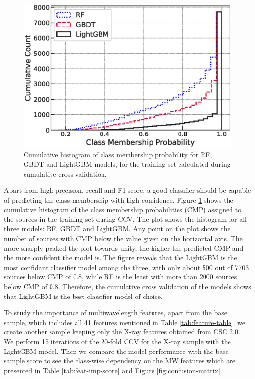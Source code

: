 \documentclass[fleqn,usenatbib]{mnras}
\begin{document}
    \begin{figure}
        \centering
        \includegraphics[width=\columnwidth]{images/prob_distribution.eps}
        \caption{Cumulative histogram of class membership probability for RF, GBDT and LightGBM models, for the training set calculated during cumulative cross validation.}
        \label{fig:cum-prob-dist}
    \end{figure}
    Apart from high precision, recall and F1 score, a good classifier should be capable of predicting the class membership with high confidence. 
    Figure \ref{fig:cum-prob-dist} shows the cumulative histogram of the class membership probabilities (CMP) assigned to the sources in the training set during CCV. The plot shows the histogram for all three models: RF, GBDT and LightGBM. Any point on the plot shows the number of sources with CMP below the value given on the horizontal axis. The more sharply peaked the plot towards unity, the higher the predicted CMP and the more confident the model is. The figure reveals that the LightGBM is the most confidant classifier model among the three, with only about 500 out of 7703 sources below CMP of 0.8, while RF is the least with more than 2000 sources below CMP of 0.8. Therefore, the cumulative cross validation of the models shows that LightGBM is the best classifier model of choice. 


    To study the importance of multiwavelength features, apart from the base sample, which includes all 41 features mentioned in Table \ref{tab:feature-table}, we create another sample keeping only the X-ray features obtained from CSC 2.0. We perform 15 iterations of the 20-fold CCV for the X-ray sample with the LightGBM model. Then we compare the model performance with the base sample score to see the class-wise dependency on the MW features which are presented in Table \ref{tab:feat-imp-score} and Figure \ref{fig:confusion-matrix}.
\end{document}
